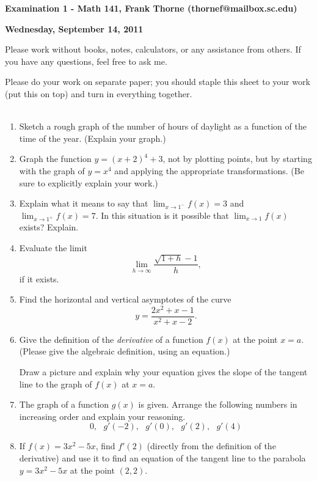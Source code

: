 \documentclass[12pt]{article}
\begin{document}
\setlength{\topmargin}{-2mm}





\begin{center}{\bf Examination 1 - Math 141, Frank Thorne (thornef@mailbox.sc.edu)}
\end{center}
\begin{center}
{\bf Wednesday, September 14, 2011}
\end{center}

Please work without books, notes, calculators, or any assistance from others. If you have
any questions, feel free to ask me. 

Please do your work on separate paper; you should staple this sheet to your work (put this on top)
and turn in everything together. 
\\
\\
\begin{enumerate}[(1)]
\item
Sketch a rough graph of the number of hours of daylight as a function of the time
of the year. (Explain your graph.)

\item
Graph the function $y = (x + 2)^4 + 3$, not by plotting points, but by
starting with the graph of $y = x^4$ and applying the appropriate transformations.
(Be sure to explicitly explain your work.)

\item
Explain what it means to say that $\lim_{x \rightarrow 1^-} f(x) = 3$
and $\lim_{x \rightarrow 1^+} f(x) = 7$. In this situation is it
possible that $\lim_{x \rightarrow 1} f(x)$ exists? Explain.

\item
Evaluate the limit
$$\lim_{h \rightarrow \infty} \frac{\sqrt{1 + h} - 1}{h},$$
if it exists.
\item
Find the horizontal and vertical asymptotes of the curve
$$y = \frac{2x^2 + x - 1}{x^2 + x - 2}.$$

\item
Give the definition of the {\itshape derivative} of a function
$f(x)$ at the point $x = a$. (Please give the algebraic definition,
using an equation.)

Draw a picture and explain why your
equation gives the slope of the tangent line to the graph of $f(x)$
at $x = a$.

\item
The graph of a function $g(x)$ is given. Arrange the
following numbers in increasing order and explain your reasoning.
$$0, \ \ \ g'(-2), \ \ \ g'(0), \ \ \ g'(2), \ \ \ g'(4)$$
\item
If $f(x) = 3x^2 - 5x$, find $f'(2)$ (directly from the definition 
of the derivative) and use it to find an equation of the tangent line
to the parabola $y = 3 x^2 - 5x$ at the point $(2, 2)$.

\end{enumerate}
\end{document}
